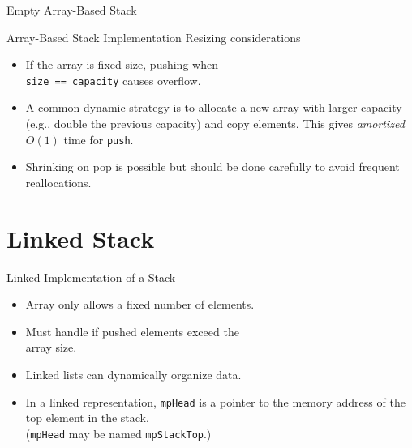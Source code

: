 \documentclass[14pt,aspectratio=1610]{beamer}
\begin{document}
\begin{frame}{Empty Array-Based Stack}
\end{frame}

\begin{frame}{Array-Based Stack Implementation}
  Resizing considerations
\begin{itemize}
\item
  If the array is fixed-size, pushing when \\\lstinline{size == capacity} causes overflow.
\item
  A common dynamic strategy is to allocate a new array with larger capacity
  (e.g., double the previous capacity) and copy elements. This gives
  \textit{amortized} \(O(1)\) time for \lstinline{push}.
\item
  Shrinking on pop is possible but should be done carefully to avoid
  frequent reallocations.
\end{itemize}
\end{frame}

\section{Linked Stack}


\begin{frame}{Linked Implementation of a Stack}
\begin{itemize}[<+->]\setlength\itemsep{0.5em}
\item
  Array only allows a fixed number of elements.
\item
  Must handle if pushed elements exceed the\\ array size.
\item
  Linked lists can dynamically organize data.
\item
  In a linked representation, \lstinline{mpHead} is a pointer to the memory address of the top element in the stack.\\
  (\lstinline{mpHead} may be named \lstinline{mpStackTop}.)
\end{itemize}
\end{frame}
\end{document}
